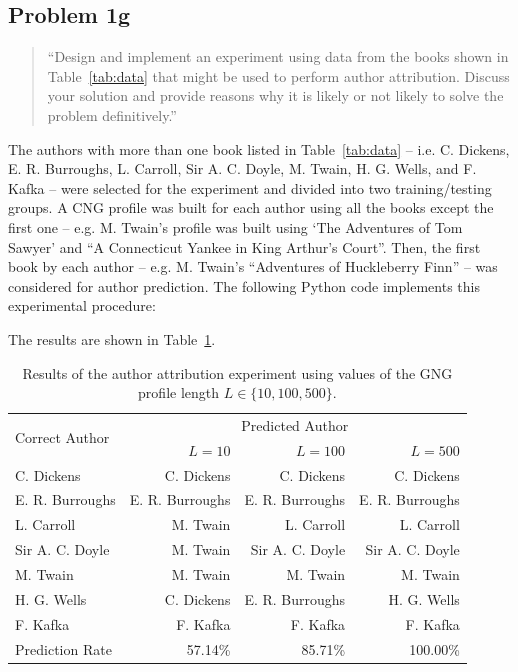 \documentclass[conference]{IEEEtran}
\newcommand{\codefile}[1]{
  \begin{framed}
  \fontsize{5.65}{6.78}\selectfont
  
  \end{framed}
}
\begin{document}
\subsection{Problem 1g}
\label{sec:problem1g}

\begin{quote}
``Design and implement an experiment using data from the books shown in Table~\ref{tab:data}
that might be used to perform author attribution. Discuss your solution and provide reasons 
why it is likely or not likely to solve the problem definitively.''
\end{quote}

The authors with more than one book listed in Table~\ref{tab:data} 
-- i.e. C. Dickens, E. R. Burroughs, L. Carroll, Sir A. C. Doyle, M. Twain, 
H. G. Wells, and F. Kafka -- were selected for the experiment and divided 
into two training/testing groups. A CNG profile was built for each author using 
all the books except the first one -- e.g. M. Twain's profile was built using 
`The Adventures of Tom Sawyer' and ``A Connecticut Yankee in King Arthur's Court''. 
Then, the first book by each author -- e.g. M. Twain's ``Adventures of Huckleberry Finn'' 
-- was considered for author prediction. The following Python code implements 
this experimental procedure:

\codefile{problem1g.py}

The results are shown in Table~\ref{tab:problem1g}.


\begin{table}
\caption{\hspace{1.4em}Results of the author attribution experiment using \newline
values of the GNG profile length $L\in\{10,100,500\}$.\label{tab:problem1g}}
\vspace{-10pt}
\begin{center}
\begin{tabular}{lr@{\hspace{1em}}r@{\hspace{1em}}r}
\hline 
\multirow{2}{*}{Correct Author} & \multicolumn{3}{c}{Predicted Author}\tabularnewline
\cline{2-4} 
 & $L=10$ & $L=100$ & $L=500$\tabularnewline
\hline
C. Dickens & C. Dickens & C. Dickens & C. Dickens \\
E. R. Burroughs & E. R. Burroughs & E. R. Burroughs & E. R. Burroughs \\
L. Carroll & M. Twain & L. Carroll & L. Carroll \\
Sir A. C. Doyle & M. Twain & Sir A. C. Doyle & Sir A. C. Doyle \\
M. Twain & M. Twain & M. Twain & M. Twain \\
H. G. Wells & C. Dickens & E. R. Burroughs & H. G. Wells \\
F. Kafka & F. Kafka & F. Kafka & F. Kafka \\
\hline
Prediction Rate & 57.14\% & 85.71\% & 100.00\%\\
\hline
\end{tabular}
\end{center}
\end{table} 
    
\end{document}
